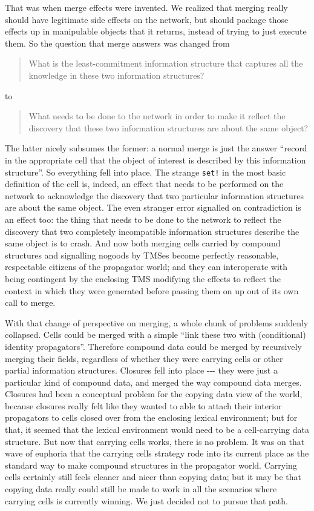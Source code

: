 \documentclass[12pt,letterpaper,english]{article}
\begin{document}
That was when merge effects were invented.  We realized that merging
really should have legitimate side effects on the network, but should
package those effects up in manipulable objects that it returns,
instead of trying to just execute them.  So the question that merge
answers was changed from
\begin{quote}

What is the least-commitment information structure that captures
all the knowledge in these two information structures?
\end{quote}
to
\begin{quote}

What needs to be done to the network in order to make it reflect the
discovery that these two information structures are about the same
object?
\end{quote}

The latter nicely subsumes the former: a normal merge is just the
answer ``record in the appropriate cell that the object of interest is
described by this information structure''.  So everything fell into
place.  The strange \texttt{set!} in the most basic definition of the cell
is, indeed, an effect that needs to be performed on the network to
acknowledge the discovery that two particular information structures
are about the same object.  The even stranger error signalled on
contradiction is an effect too: the thing that needs to be done to the
network to reflect the discovery that two completely incompatible
information structures describe the same object is to crash.  And now
both merging cells carried by compound structures and signalling
nogoods by TMSes become perfectly reasonable, respectable citizens of
the propagator world; and they can interoperate with being contingent
by the enclosing TMS modifying the effects to reflect the context in
which they were generated before passing them on up out of its own
call to merge.

With that change of perspective on merging, a whole chunk of problems
suddenly collapsed.  Cells could be merged with a simple ``link these
two with (conditional) identity propagators''.  Therefore compound data
could be merged by recursively merging their fields, regardless of
whether they were carrying cells or other partial information
structures.  Closures fell into place -{}-{}- they were just a particular
kind of compound data, and merged the way compound data merges.
Closures had been a conceptual problem for the copying data view of
the world, because closures really felt like they wanted to able to
attach their interior propagators to cells closed over from the
enclosing lexical environment; but for that, it seemed that the
lexical environment would need to be a cell-carrying data structure.
But now that carrying cells works, there is no problem.  It was on
that wave of euphoria that the carrying cells strategy rode into its
current place as the standard way to make compound structures in the
propagator world.  Carrying cells certainly still feels cleaner and
nicer than copying data; but it may be that copying data really could
still be made to work in all the scenarios where carrying cells is
currently winning.  We just decided not to pursue that path.
\end{document}
